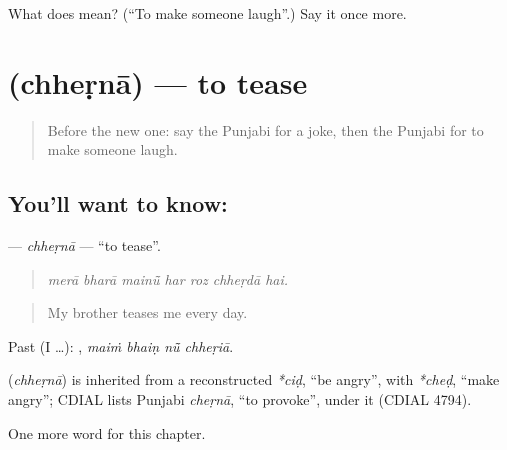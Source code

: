 \begin{tcolorbox}[breakable,colback=teal!4,colframe=teal!35!black,title={Before you move on}]
What does  mean? (\textquotedblleft{}To make someone laugh\textquotedblright{}.) Say it once more.
\end{tcolorbox}
\section[\texorpdfstring{\pa{ਛੇੜਨਾ} (chheṛnā)}{ਛੇੜਨਾ (chheṛnā)}]{ (chheṛnā) — to tease}

\label{lesson:PA-C355-chherna}



\begin{quote}
Before the new one: say the Punjabi for a joke, then the Punjabi for to make someone laugh.
\end{quote}

\subsection*{You'll want to know: }
\textbf{} — \emph{chheṛnā} — \textquotedblleft{}to tease\textquotedblright{}.

\begin{quote}
      
\end{quote}

\begin{quote}
\emph{merā bharā mainū̃ har roz chheṛdā hai.}
\end{quote}

\begin{quote}
My brother teases me every day.
\end{quote}

Past (I …):    , \emph{maiṁ bhaiṇ nū̃ chheṛiā}.

\begin{cousinweb}
\textbf{} (\emph{chheṛnā}) is inherited from a reconstructed \emph{*ciḍ}, \textquotedblleft{}be angry\textquotedblright{}, with \emph{*cheḍ}, \textquotedblleft{}make angry\textquotedblright{}; CDIAL lists Punjabi \emph{cheṛnā}, \textquotedblleft{}to provoke\textquotedblright{}, under it (CDIAL 4794).
\end{cousinweb}

\begin{grammarlens}[title={What you've built}]
One more word for this chapter.
\end{grammarlens}

